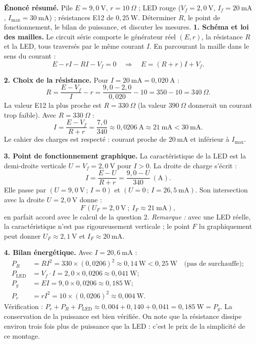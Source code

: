 \documentclass[11pt]{article}
\begin{document}
\begin{exoresolu}
\textbf{Énoncé résumé.} Pile $E = 9{,}0\ \text{V}$, $r = 10\ \Omega$ ; LED rouge ($V_f = 2{,}0\ \text{V}$, $I_f = 20\ \text{mA}$, $I_{\max} = 30\ \text{mA}$) ; résistances E12 de $0{,}25\ \text{W}$. Déterminer $R$, le point de fonctionnement, le bilan de puissance, et discuter les mesures.
\tcblower
\textbf{1. Schéma et loi des mailles.} Le circuit série comporte le générateur réel $(E, r)$, la résistance $R$ et la LED, tous traversés par le même courant $I$. En parcourant la maille dans le sens du courant :
\[ E - rI - RI - V_f = 0 \quad \Longrightarrow \quad E = (R + r)I + V_f. \]

\textbf{2. Choix de la résistance.} Pour $I = 20\ \text{mA} = 0{,}020\ \text{A}$ :
\[ R = \frac{E - V_f}{I} - r = \frac{9{,}0 - 2{,}0}{0{,}020} - 10 = 350 - 10 = 340\ \Omega. \]
La valeur E12 la plus proche est $R = 330\ \Omega$ (la valeur $390\ \Omega$ donnerait un courant trop faible). Avec $R = 330\ \Omega$ :
\[ I = \frac{E - V_f}{R + r} = \frac{7{,}0}{340} \approx 0{,}0206\ \text{A} \approx 21\ \text{mA} < 30\ \text{mA}. \]
Le cahier des charges est respecté : courant proche de $20\ \text{mA}$ et inférieur à $I_{\max}$.

\textbf{3. Point de fonctionnement graphique.} La caractéristique de la LED est la demi-droite verticale $U = V_f = 2{,}0\ \text{V}$ pour $I > 0$. La droite de charge s'écrit :
\[ I = \frac{E - U}{R + r} = \frac{9{,}0 - U}{340}\ (\text{A}). \]
Elle passe par $(U = 9{,}0\ \text{V}\,;\, I = 0)$ et $(U = 0\,;\, I = 26{,}5\ \text{mA})$. Son intersection avec la droite $U = 2{,}0\ \text{V}$ donne :
\[ F\,(U_F = 2{,}0\ \text{V}\ ;\ I_F \approx 21\ \text{mA}), \]
en parfait accord avec le calcul de la question 2. \emph{Remarque :} avec une LED réelle, la caractéristique n'est pas rigoureusement verticale ; le point $F$ lu graphiquement peut donner $U_F \approx 2{,}1\ \text{V}$ et $I_F \approx 20\ \text{mA}$.

\textbf{4. Bilan énergétique.} Avec $I = 20{,}6\ \text{mA}$ :
\begin{align*}
P_R &= RI^2 = 330 \times (0{,}0206)^2 \approx 0{,}14\ \text{W} < 0{,}25\ \text{W} \quad \text{(pas de surchauffe)} ;\\
P_{\text{LED}} &= V_f \cdot I = 2{,}0 \times 0{,}0206 \approx 0{,}041\ \text{W} ;\\
P_g &= EI = 9{,}0 \times 0{,}0206 \approx 0{,}185\ \text{W} ;\\
P_r &= rI^2 = 10 \times (0{,}0206)^2 \approx 0{,}004\ \text{W}.
\end{align*}
Vérification : $P_r + P_R + P_{\text{LED}} \approx 0{,}004 + 0{,}140 + 0{,}041 = 0{,}185\ \text{W} = P_g$. La conservation de la puissance est bien vérifiée. On note que la résistance dissipe environ trois fois plus de puissance que la LED : c'est le prix de la simplicité de ce montage.


\end{exoresolu}
\end{document}
